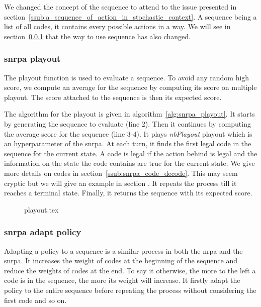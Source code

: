 We changed the concept of the sequence to attend to the issue presented in section~\ref{ssub:a_sequence_of_action_in_stochastic_context}.
A sequence being a list of all codes, it contains every possible actions in a way.
We will see in section~\ref{ssub:srnpa_playout} that the way to use sequence has also changed.

\subsubsection{\acrshort{snrpa} playout}%
\label{ssub:srnpa_playout}

The playout function is used to evaluate a sequence.
To avoid any random high score, we compute an average for the sequence by computing its score on multiple playout.
The score attached to the sequence is then its expected score.

The algorithm for the playout is given in algorithm~\ref{alg:snrpa_playout}.
It starts by generating the sequence to evaluate (line 2).
Then it continues by computing the average score for the sequence (line 3-4).
It plays \textit{nbPlayout}  playout which is an hyperparameter of the \gls{snrpa}.
At each turn, it finds the first legal code in the sequence for the current state.
A code is legal if the action behind is legal and the information on the state the code contains are true for the current state.
We give more details on codes in section~\ref{ssub:snrpa_code_decode}.
This may seem cryptic but we will give an example in section .
It repeats the process till it reaches a terminal state.
Finally, it returns the sequence with its expected score.

\begin{figure}[htpb]
    \centering
    \begin{minipage}{.7\linewidth}
        {playout.tex}
    \end{minipage}
\end{figure}

\subsubsection{\acrshort{snrpa} adapt policy}%
\label{ssub:snrpa_adapt_policy}

Adapting a policy to a sequence is a similar process in both the \gls{nrpa} and the \gls{snrpa}.
It increases the weight of codes at the beginning of the sequence and reduce the weights of codes at the end.
To say it otherwise, the more to the left a code is in the sequence, the more its weight will increase.
It firstly adapt the policy to the entire sequence before repeating the process without considering the first code and so on.

